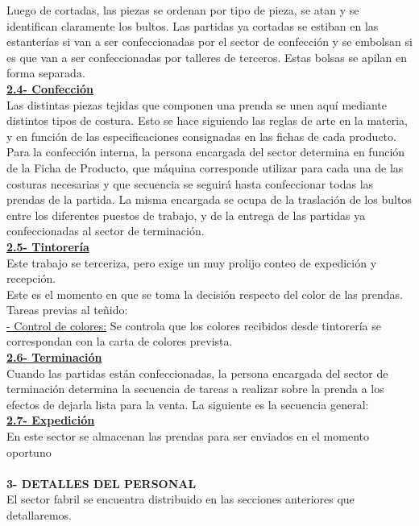 \documentclass[a4paper,12pt,titlepage]{article}
\begin{document}
Luego de cortadas, las piezas se ordenan por tipo de pieza, se atan y se identifican
claramente los bultos. Las partidas ya cortadas se estiban en las estanter\'{i}as si van
a ser confeccionadas por el sector de confecci\'{o}n y se embolsan si es que van a ser
confeccionadas por talleres de terceros. Estas bolsas se apilan en forma separada.\\
\textbf{\underline{2.4- Confecci\'{o}n}}\\
Las distintas piezas tejidas que componen una prenda se unen aqu\'{i} mediante
distintos tipos de costura. Esto se hace siguiendo las reglas de arte en la materia, y
en funci\'{o}n de las especificaciones consignadas en las fichas de cada producto.
Para la confecci\'{o}n interna, la persona encargada del sector determina en funci\'{o}n
de la Ficha de Producto, que m\'{a}quina corresponde utilizar para cada una de las
costuras necesarias y que secuencia se seguir\'{a} hasta confeccionar todas las
prendas de la partida. La misma encargada se ocupa de la traslaci\'{o}n de los bultos
entre los diferentes puestos de trabajo, y de la entrega de las partidas ya
confeccionadas al sector de terminaci\'{o}n.\\
\textbf{\underline{2.5- Tintorería}}\\
Este trabajo se terceriza, pero exige un muy prolijo conteo de expedici\'{o}n y
recepci\'{o}n.\\
Este es el momento en que se toma la decisi\'{o}n respecto del color de las prendas.\\
Tareas previas al te\~nido:\\
\underline{ - Control de colores:} Se controla que los colores recibidos desde tintorer\'{i}a se
correspondan con la carta de colores prevista.\\
\textbf{\underline{2.6- Terminaci\'{o}n}}\\
Cuando las partidas est\'{a}n confeccionadas, la persona encargada del sector de
terminaci\'{o}n determina la secuencia de tareas a realizar sobre la prenda a los
efectos de dejarla lista para la venta. La siguiente es la secuencia general:\\
\textbf{\underline{2.7- Expedici\'{o}n}}\\
En este sector se almacenan las prendas para ser enviados en el momento
oportuno\\ \\
\textbf{3- DETALLES DEL PERSONAL}\\
El sector fabril se encuentra distribuido en las secciones anteriores que
detallaremos.\\
\end{document}
